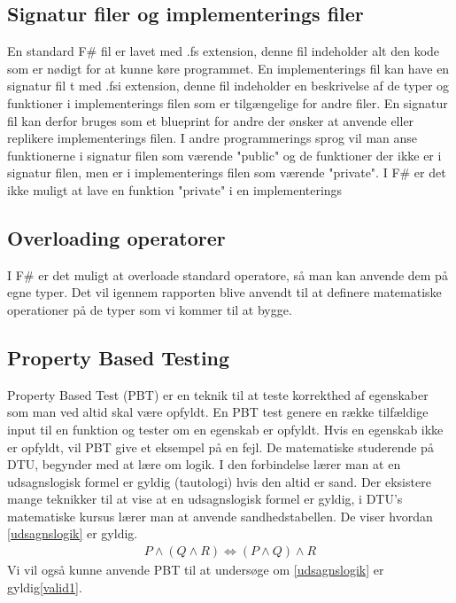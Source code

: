 \subsection{Signatur filer og implementerings filer}
En standard F\# fil er lavet med .fs extension, denne fil indeholder alt den kode som er nødigt for at kunne køre programmet. En implementerings fil kan have en signatur fil t med .fsi extension, denne fil indeholder en beskrivelse af de typer og funktioner i implementerings filen som er tilgængelige for andre filer. En signatur fil kan derfor bruges som et blueprint for andre der ønsker at anvende eller replikere implementerings filen. I andre programmerings sprog vil man anse funktionerne i signatur filen som værende "public" og de funktioner der ikke er i signatur filen, men er i implementerings filen som værende "private". I F\# er det ikke muligt at lave en funktion "private" i en implementerings

\subsection{Overloading operatorer}
I F\# er det muligt at overloade standard operatore, så man kan anvende dem på egne typer. Det vil igennem rapporten blive anvendt til at definere matematiske operationer på de typer som vi kommer til at bygge.

\subsection{Property Based Testing}
Property Based Test (PBT) er en teknik til at teste korrekthed af egenskaber som man ved altid skal være opfyldt. En PBT test genere en række tilfældige input til en funktion og tester om en egenskab er opfyldt. Hvis en egenskab ikke er opfyldt, vil PBT give et eksempel på en fejl. De matematiske studerende på DTU, begynder med at lære om logik. I den forbindelse lærer man at en udsagnslogisk formel er gyldig (tautologi) hvis den altid er sand. Der eksistere mange teknikker til at vise at en udsagnslogisk formel er gyldig, i DTU's matematiske kursus lærer man at anvende sandhedstabellen. De viser hvordan \ref{udsagnslogik} er gyldig. 
\begin{gather}
    P \land (Q \land R) \iff (P \land Q) \land R
    \label{udsagnslogik}
\end{gather}
Vi vil også kunne anvende PBT til at undersøge om \ref{udsagnslogik} er gyldig\ref{valid1}.




